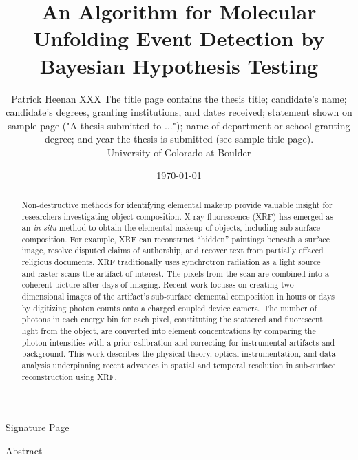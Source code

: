 \documentclass[%
  aip,12pt,tightenlines,
  amsthm,
 amsmath,amssymb
]{article}
\newcommand{\firstp}[0]{}
\begin{document}
\singlespacing


\title{An Algorithm for Molecular Unfolding Event Detection by Bayesian Hypothesis Testing}
\date{\today}
\author{Patrick Heenan XXX The title page contains the thesis title; candidate's name; candidate's degrees, granting institutions, and dates received; statement shown on sample page ("A thesis submitted to ..."); name of department or school granting degree; and year the thesis is submitted (see sample title page).
 \\  University of Colorado at Boulder }

\maketitle
\thispagestyle{empty}


\clearpage

Signature Page

\clearpage

Abstract

\begin{abstract}

\firstp Non-destructive methods for identifying elemental makeup provide valuable insight for researchers investigating object composition. X-ray fluorescence (XRF) has emerged as an \emph{in situ} method to obtain the elemental makeup of objects, including sub-surface composition. For example, XRF can reconstruct “hidden” paintings beneath a surface image, resolve disputed claims of authorship, and recover text from partially effaced religious documents. XRF traditionally uses synchrotron radiation as a light source and raster scans the artifact of interest. The pixels from the scan are combined into a coherent picture after days of imaging. Recent work focuses on creating two-dimensional images of the artifact's sub-surface elemental composition in hours or days by digitizing photon counts onto a charged coupled device camera. The number of photons in each energy bin for each pixel, constituting the scattered and fluorescent light from the object, are converted into element concentrations by comparing the photon intensities with a prior calibration and correcting for instrumental artifacts and background. This work describes the physical theory, optical instrumentation, and data analysis underpinning recent advances in spatial and temporal resolution in sub-surface reconstruction using XRF. 
\end{abstract}
\end{document}
